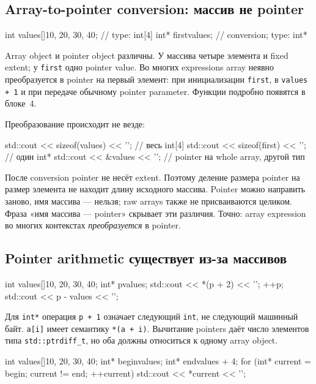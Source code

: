 \subsection{Array-to-pointer conversion: массив не pointer}

\begin{cppcode}
int values[]{10, 20, 30, 40}; // type: int[4]
int* first{values};           // conversion; type: int*
\end{cppcode}

Array object и pointer object различны. У массива четыре элемента и fixed
extent; у \texttt{first} одно pointer value. Во многих expressions array
неявно преобразуется в pointer на первый элемент: при инициализации
\texttt{first}, в \texttt{values + 1} и при передаче обычному pointer
parameter. Функции подробно появятся в блоке~4.

Преобразование происходит не везде:

\begin{cppcode}
std::cout << sizeof(values) << '\n'; // весь int[4]
std::cout << sizeof(first) << '\n';  // один int*
std::cout << &values << '\n';        // pointer на whole array, другой тип
\end{cppcode}

После conversion pointer не несёт extent. Поэтому деление размера pointer на
размер элемента не находит длину исходного массива. Pointer можно
направить заново, имя массива --- нельзя; raw arrays также не присваиваются
целиком. Фраза «имя массива --- pointer» скрывает эти различия. Точно:
array expression во многих контекстах \emph{преобразуется} в pointer.

\subsection{Pointer arithmetic существует из-за массивов}

\begin{cppcode}
int values[]{10, 20, 30, 40};
int* p{values};
std::cout << *(p + 2) << '\n';
++p;
std::cout << p - values << '\n';
\end{cppcode}

Для \texttt{int*} операция \texttt{p + 1} означает следующий \texttt{int},
не следующий машинный байт. \texttt{a[i]} имеет семантику
\texttt{*(a + i)}. Вычитание pointers даёт число элементов типа
\texttt{std::ptrdiff\_t}, но оба должны относиться к одному array object.

\begin{cppcode}
int values[]{10, 20, 30, 40};
int* begin{values};
int* end{values + 4};
for (int* current = begin; current != end; ++current) {
    std::cout << *current << '\n';
}
\end{cppcode}

